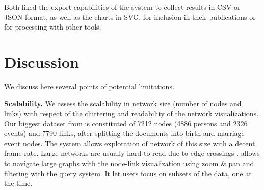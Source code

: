 Both liked the export capabilities of the system to collect results in CSV or JSON format, as well as the charts in SVG, for inclusion in their publications or for processing with other tools.





\iffalse
\section{Discussion}

Useful to social scientists provide a good trade-off between expressive power and simplicity compared to alternatives, either not expressive enough or too complex.

Compared to other systems:
\textbf{Jigsaw}: close on many aspects, also relies on a stable data model, but more expressive using attributes and roles. Yet, we do not handle general named entities that seem less important than for intelligence analysis; they can sometimes be emulated with attributes.

We applied it to other projects, such as research administration: publication and contracts visualization, and exploration.


\textbf{VERTIGo}: similar for queries, but VERTIGo is able to adapt to any data model, does not prescribe a data model, and handle attributes.

We want to distribute \name as an open-source tool and facilitate its use.

Still needs the help of a programmer to import data. Other systems, such as Gephi, provide plugins for that.

\jdf{Maybe} We need to improve the usability, most of the use cases have been done with the help of the authors.


Possible discussion points :
- Hard to evaluate
- No dynamic visualization
- A bit hard to do query on the orders of events
- Dirty data

\fi


\section{Discussion}

We discuss here several points of potential limitations.

\textbf{Scalability.} We assess the scalability in network size (number of nodes and links) with respect of the cluttering and readability of the network visualizations. Our biggest dataset from \zacarias\xspace is constituted of 7212 nodes (4886 persons and 2326 events) and 7790 links, after splitting the documents into birth and marriage event nodes. The system allows exploration of network of this size with a decent frame rate. Large networks are usually hard to read due to edge crossings \cite{shneiderman2006network}. \name allows to navigate large graphs with the node-link visualization using zoom \& pan and filtering with the query system. It let users focus on subsets of the data, one at the time.

